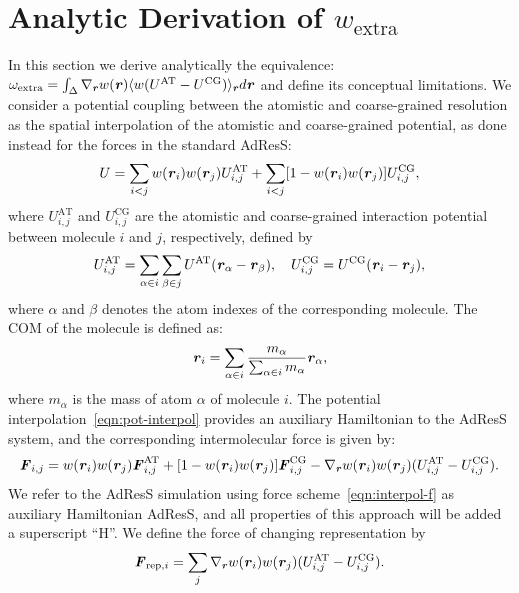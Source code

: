 \documentclass[a4paper,preprint,unsortedaddress]{revtex4-1}
\newcommand{\vect}[1]{\textbf{\textit{#1}}}
\newcommand{\AT}{{\textrm{{AT}}}}
\newcommand{\CG}{{\textrm{CG}}}
\newcommand{\res}{{\textrm{rep}}}
\newcommand{\ext}{{\textrm{extra}}}
\begin{document}
\section{Analytic Derivation of  $w_{\ext}$}\label{sec:tmp4}
{In this section we derive analytically the equivalence:
  $\omega_{\ext}=\int_{\Delta}\nabla_{\vect r} w(\vect r) \langle w(U^{\AT}-U^{\CG})\rangle_{\vect r} d{\vect r}$ and define its conceptual limitations.
We consider a potential coupling between the atomistic and coarse-grained resolution as the spatial interpolation of the atomistic and coarse-grained potential, as done instead for the forces in the standard AdResS:
\begin{align}
  U =
  \sum_{i<j} w(\vect r_i) w(\vect r_j)
  U^\AT_{i,j}
  +
  \sum_{i<j}[1- w(\vect r_i) w(\vect r_j)]
  U^\CG_{i,j},
\end{align}
where $U^\AT_{i,j}$ and $U^\CG_{i,j}$ are the atomistic and coarse-grained interaction potential between molecule $i$ and $j$, respectively, defined by
\begin{align}\label{eqn:pot-interpol}
  U^\AT_{i,j} =
  \sum_{\alpha\in i}\sum_{\beta\in j} U^\AT(\vect r_\alpha - \vect r_\beta),\quad
  U^\CG_{i,j} =
  U^\CG(\vect r_i - \vect r_j),
\end{align}
where  $\alpha$ and $\beta$ denotes the atom indexes of the corresponding molecule.
The COM of the molecule is defined as:
\begin{align}
  \vect r_i = \sum_{\alpha\in i} \frac{m_\alpha}{\sum_{\alpha\in i} m_\alpha} \vect r_\alpha,
\end{align}
where $m_\alpha$ is the mass of atom $\alpha$ of molecule $i$.
{The potential interpolation~\eqref{eqn:pot-interpol} provides an auxiliary Hamiltonian to the AdResS system, and
the
corresponding intermolecular force is given by:}
\begin{align}\label{eqn:interpol-f}
  \vect F_{i,j} =
  w(\vect r_i) w(\vect r_j)
  \vect F^\AT_{i,j}
  +
  [1- w(\vect r_i) w(\vect r_j)]
  \vect F_{i,j}^\CG
  -
  \nabla_{\vect r} w(\vect r_i) w(\vect r_j)
  (U^\AT_{i,j} - U^\CG_{i,j}).
\end{align}
{We refer to the AdResS simulation using force scheme~\eqref{eqn:interpol-f} as
  auxiliary Hamiltonian AdResS, and all properties of this approach will be added a superscript ``H''}.
We define the force of changing representation by
\begin{align}\label{eqn:frep}
  \vect F_{\res,i} = 
  \sum_j \nabla_{\vect r} w(\vect r_i) w(\vect r_j)
  (U^\AT_{i,j} - U^\CG_{i,j}).
\end{align}


}
\end{document}
